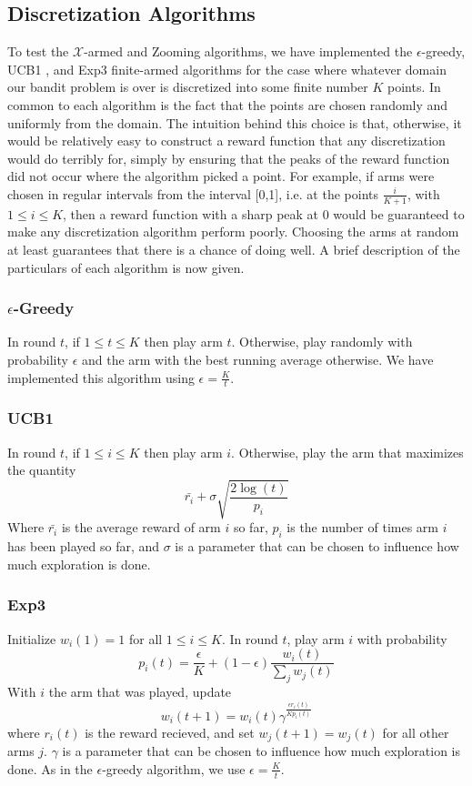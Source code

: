 \subsection{Discretization Algorithms}
To test the $\mathcal{X}$-armed and Zooming algorithms, we have
implemented the $\epsilon$-greedy, UCB1 \cite{auer2002finite}, and
Exp3 \cite{auer1995gambling} finite-armed algorithms for the case
where whatever domain our bandit problem is over is discretized into
some finite number $K$ points.  In common to each algorithm is the
fact that the points are chosen randomly and uniformly from the
domain.  The intuition behind this choice is that, otherwise, it would
be relatively easy to construct a reward function that any
discretization would do terribly for, simply by ensuring that the
peaks of the reward function did not occur where the algorithm picked
a point.  For example, if arms were chosen in regular intervals from
the interval [0,1], i.e. at the points $\frac{i}{K+1}$, with $1 \leq i
\leq K$, then a reward function with a sharp peak at 0 would be
guaranteed to make any discretization algorithm perform poorly.
Choosing the arms at random at least guarantees that there is a chance
of doing well.  A brief description of the particulars of each
algorithm is now given.

\subsubsection{$\epsilon$-Greedy}
In round $t$, if $1 \leq t \leq K$ then play arm $t$.  Otherwise, play
randomly with probability $\epsilon$ and the arm with the best running
average otherwise.  We have implemented this algorithm using $\epsilon
= \frac{K}{t}$.

\subsubsection{UCB1}
In round $t$, if $1 \leq i \leq K$ then play arm $i$.  Otherwise, play
the arm that maximizes the quantity
\[
	\bar{r_i} + \sigma \sqrt{\frac{2 \log(t)}{p_i}}
\]
Where $\bar{r_i}$ is the average reward of arm $i$ so far, $p_i$ is the 
number of times arm $i$ has been played so far, and $\sigma$ is a parameter
that can be chosen to influence how much exploration is done.

\subsubsection{Exp3}
Initialize $w_i(1) = 1$ for all $1 \leq i \leq K$.  In round $t$, play
arm $i$ with probability
\[
	p_i(t) = \frac{\epsilon}{K} + (1 - \epsilon) \frac{w_i(t)}{\sum_j w_j(t)}
\]
With $i$ the arm that was played, update
\[
	w_i(t+1) = w_i(t)\gamma^{\frac{\epsilon r_i(t)}{K p_i(t)}}
\]
where $r_i(t)$ is the reward recieved, and set $w_j(t+1) = w_j(t)$ for all
other arms $j$.  $\gamma$ is a parameter that can be chosen to influence how
much exploration is done.  As in the $\epsilon$-greedy algorithm, we use
$\epsilon = \frac{K}{t}$.
